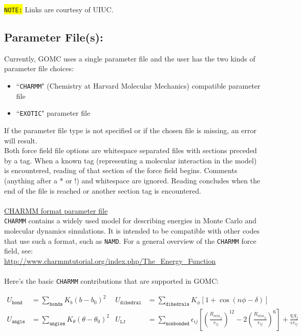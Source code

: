 \colorbox{yellow}{\texttt{NOTE:}} Links are courtesy of UIUC.\\
\subsection{Parameter File(s):}
Currently, GOMC uses a single parameter file and the user has the two kinds of parameter file choices:
\begin{itemize}
\item ``\texttt{CHARMM}" (Chemistry at Harvard Molecular Mechanics) compatible parameter file
\item ``\texttt{EXOTIC}" parameter file
\end{itemize}
If the parameter file type is not specified or if the chosen file is missing, an error will result.\\
Both force field file options are whitespace separated files with sections preceded by a tag. When a known tag (representing a molecular interaction in the model) is encountered, reading of that section of the force field begins.  Comments (anything after a * or !) and whitespace are ignored. Reading concludes when the end of the file is reached or another section tag is encountered.\\\\
\underline{CHARMM format parameter file}\\
\texttt{CHARMM} contains a widely used model for describing energies in Monte Carlo and molecular dynamics simulations. It is intended to be compatible with other codes that use such a format, such as \texttt{NAMD}.
For a general overview of the \texttt{CHARMM} force field, see:\\
\url{http://www.charmmtutorial.org/index.php/The_Energy_Function}\\\\
Here's the basic \texttt{CHARMM} contributions that are supported in GOMC:

\begin{align*}
U_{\texttt{bond}}&=\sum_{\texttt{bonds}} K_b(b-b_0)^2 & U_{\texttt{dihedral}}&=\sum_{\texttt{dihedrals}} K_{\phi} [1+\cos(n\phi - \delta)]\\
U_{\texttt{angle}}&=\sum_{\texttt{angles}} K_{\theta}(\theta-\theta_0)^2 & U_{\texttt{LJ}} &=\sum_{\texttt{nonbonded}} \epsilon_{ij}\left[\left(\frac{R_{min_{ij}}}{r_{ij}}\right)^{12}-2\left(\frac{R_{min_{ij}}}{r_{ij}}\right)^6\right]+ \frac{q_i q_j}{\epsilon r_{ij}} \\
\end{align*}

